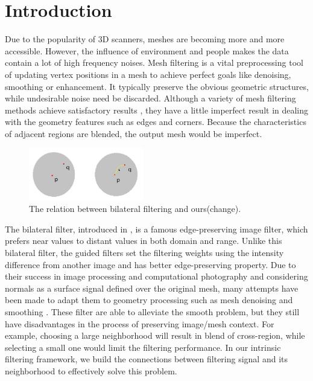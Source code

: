 \section{Introduction}


Due to the popularity of 3D scanners, meshes are becoming more and more accessible.
However, the influence of environment and people makes the data contain a lot of high frequency noises.
Mesh filtering is a vital preprocessing tool of updating vertex positions in a mesh to achieve perfect goals like denoising, smoothing or enhancement.
It typically preserve the obvious geometric structures, while undesirable noise need be discarded.
Although a variety of mesh filtering methods achieve satisfactory results \cite{fleishman2003bilateral, zheng2011bilateral},
they have a little imperfect result in dealing with the geometry features such as edges and corners.
Because the characteristics of adjacent regions are blended, the output mesh would be imperfect.

\begin{figure}[htb]
\centering
\includegraphics[width = 5.0cm]{results/relation.jpg}
\vspace{0.5mm}
\caption{ The relation between bilateral filtering and ours(change).}
\label{Fig:relation}
\end{figure}

The bilateral filter, introduced in \cite{tomasi1998bilateral}, is a famous edge-preserving image filter, which prefers near values to distant values in both domain and range.
Unlike this bilateral filter, the guided filters \cite{Petschnigg2004, he2010guided} set the filtering weights using the intensity difference from another image and has better edge-preserving property.
Due to their success in image processing and computational photography and considering normals as a surface signal defined over the original mesh,
many attempts have been made to adapt them to geometry processing such as mesh denoising and smoothing \cite{jones2003non, zheng2011bilateral, Solomon2014general}.
These filter are able to alleviate the smooth problem, but they still have disadvantages in the process of preserving image/mesh context.
For example, choosing a large neighborhood will result in blend of cross-region, while selecting a small one would limit the filtering performance.
In our intrinsic filtering framework, we build the connections between filtering signal and its neighborhood to effectively solve this problem.

